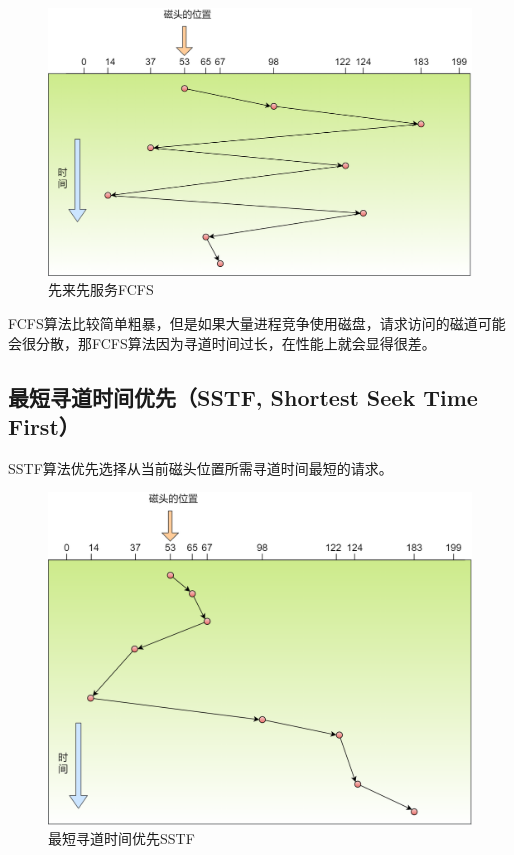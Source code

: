 \begin{figure}[H]
    \centering
    \includegraphics[scale=0.25]{img/C4/4-4/2.png}
    \caption{先来先服务FCFS}
\end{figure}

FCFS算法比较简单粗暴，但是如果大量进程竞争使用磁盘，请求访问的磁道可能会很分散，那FCFS算法因为寻道时间过长，在性能上就会显得很差。\\

\subsection{最短寻道时间优先（SSTF, Shortest Seek Time First）}

SSTF算法优先选择从当前磁头位置所需寻道时间最短的请求。

\begin{figure}[H]
    \centering
    \includegraphics[scale=0.35]{img/C4/4-4/3.png}
    \caption{最短寻道时间优先SSTF}
\end{figure}

